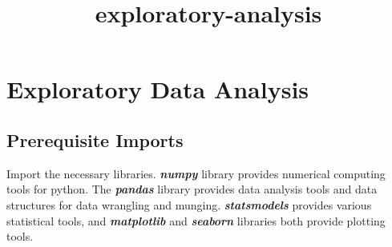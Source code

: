 \documentclass[11pt]{article}
\title{exploratory-analysis}
\begin{document}
    
    
    \maketitle
    
    

    
    \section{Exploratory Data Analysis}\label{exploratory-data-analysis}

\subsection{Prerequisite Imports}\label{prerequisite-imports}

Import the necessary libraries. \textbf{\emph{numpy}} library provides
numerical computing tools for python. The \textbf{\emph{pandas}} library
provides data analysis tools and data structures for data wrangling and
munging. \textbf{\emph{statsmodels}} provides various statistical tools,
and \textbf{\emph{matplotlib}} and \textbf{\emph{seaborn}} libraries
both provide plotting tools.
\end{document}
